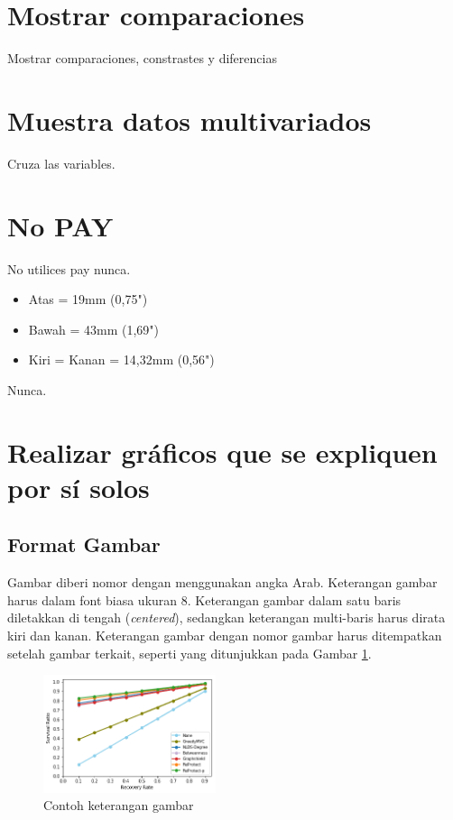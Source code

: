 \documentclass[conference, a4paper]{IEEEtran_ID}
\begin{document}
\section{Mostrar comparaciones}

Mostrar comparaciones, constrastes y diferencias

\section{Muestra datos multivariados}

Cruza las variables. 

\section{No PAY}

No utilices pay nunca. 

\begin{itemize}
	\item Atas = 19mm (0,75")
	\item Bawah = 43mm (1,69")
	\item Kiri = Kanan = 14,32mm (0,56")
\end{itemize}
	
Nunca. 

\section{Realizar gráficos que se expliquen por sí solos}



\subsection{Format Gambar}
	
	Gambar diberi nomor dengan menggunakan angka Arab. Keterangan gambar harus dalam font biasa ukuran 8. Keterangan gambar dalam satu baris diletakkan di tengah (\textit{centered}), sedangkan keterangan multi-baris harus dirata kiri dan kanan. Keterangan gambar dengan nomor gambar harus ditempatkan setelah gambar terkait, seperti yang ditunjukkan pada Gambar \ref{fig_sample}.

	\begin{figure}[htbp]
		\centerline{\includegraphics[width=0.45\textwidth]{figure.png}}
		\caption{Contoh keterangan gambar}
		\label{fig_sample}
	\end{figure}
\end{document}
